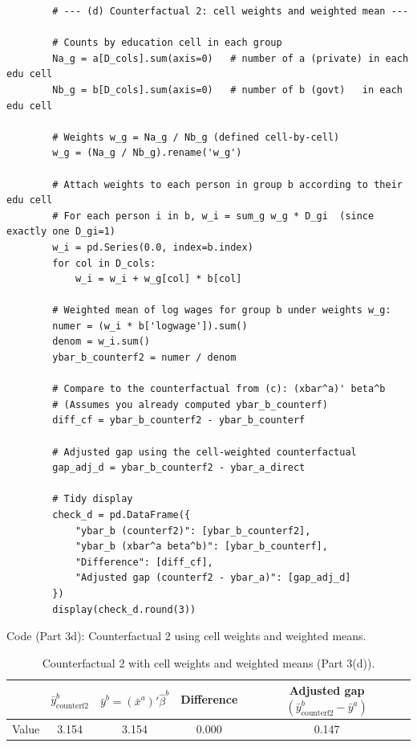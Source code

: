 \documentclass[12pt]{article}
\numberwithin{equation}{section}
\begin{document}
\begin{enumerate}[leftmargin=2em]
\begin{enumerate}[label=(\alph*),leftmargin=1.6em]
\begin{listing}[H]
\begin{verbatim}
        # --- (d) Counterfactual 2: cell weights and weighted mean ---
        
        # Counts by education cell in each group
        Na_g = a[D_cols].sum(axis=0)   # number of a (private) in each edu cell
        Nb_g = b[D_cols].sum(axis=0)   # number of b (govt)   in each edu cell
        
        # Weights w_g = Na_g / Nb_g (defined cell-by-cell)
        w_g = (Na_g / Nb_g).rename('w_g')
        
        # Attach weights to each person in group b according to their edu cell
        # For each person i in b, w_i = sum_g w_g * D_gi  (since exactly one D_gi=1)
        w_i = pd.Series(0.0, index=b.index)
        for col in D_cols:
            w_i = w_i + w_g[col] * b[col]
        
        # Weighted mean of log wages for group b under weights w_g:
        numer = (w_i * b['logwage']).sum()
        denom = w_i.sum()
        ybar_b_counterf2 = numer / denom
        
        # Compare to the counterfactual from (c): (xbar^a)' beta^b
        # (Assumes you already computed ybar_b_counterf)
        diff_cf = ybar_b_counterf2 - ybar_b_counterf
        
        # Adjusted gap using the cell-weighted counterfactual
        gap_adj_d = ybar_b_counterf2 - ybar_a_direct
        
        # Tidy display
        check_d = pd.DataFrame({
            "ybar_b (counterf2)": [ybar_b_counterf2],
            "ybar_b (xbar^a beta^b)": [ybar_b_counterf],
            "Difference": [diff_cf],
            "Adjusted gap (counterf2 - ybar_a)": [gap_adj_d]
        })
        display(check_d.round(3))
        \end{verbatim}
        \caption{Code (Part 3d): Counterfactual 2 using cell weights and weighted means.}
    \end{listing}

    \begin{table}[H]
    \centering
    \small
    \caption{Counterfactual 2 with cell weights and weighted means (Part 3(d)).}
    \label{tab:counterfactual2}
    \begin{tabularx}{\textwidth}{l S S S S}
        \toprule
        & {\textbf{$\bar{y}^b_{\text{counterf2}}$}} & {\textbf{$\bar{y}^b = (\bar{x}^a)'\hat{\beta}^b$}} & {\textbf{Difference}} & {\textbf{Adjusted gap $(\bar{y}^b_{\text{counterf2}} - \bar{y}^a)$}} \\
        \midrule
        Value & 3.154 & 3.154 & 0.000 & 0.147 \\
        \bottomrule
    \end{tabularx}
    

\end{table}
\end{enumerate}
\end{enumerate}
\end{document}
